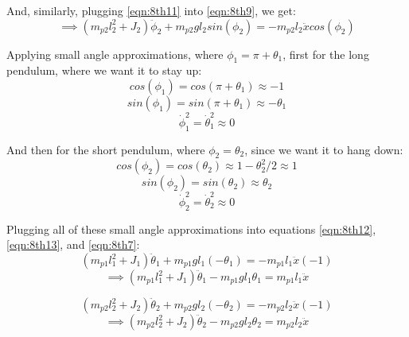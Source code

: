 \documentclass{article}
\begin{document}
And, similarly, plugging \ref{eqn:8th11} into \ref{eqn:8th9}, we get:
\begin{equation}
\implies (m_{p2} l_2^2 + J_2) \ddot{\phi}_2 + m_{p2} g l_2 sin(\phi_2) = -m_{p2} l_2 \ddot{x} cos(\phi_2)
\label{eqn:8th13}
\end{equation}

Applying small angle approximations, where $\phi_1 = \pi + \theta_1$, first for the long pendulum, where we want it to stay up:
\begin{equation*}
cos(\phi_1) = cos(\pi + \theta_1) \approx -1
\end{equation*}
\begin{equation*}
sin(\phi_1) = sin(\pi + \theta_1) \approx - \theta_1
\end{equation*}
\begin{equation*}
\dot{\phi}_1^2 = \dot{\theta}_1^2 \approx 0
\end{equation*}

And then for the short pendulum, where $\phi_2 = \theta_2$, since we want it to hang down:
\begin{equation*}
cos(\phi_2) = cos(\theta_2) \approx 1 - \theta_2^2 / 2 \approx 1
\end{equation*}
\begin{equation*}
sin(\phi_2) = sin(\theta_2) \approx \theta_2
\end{equation*}
\begin{equation*}
\dot{\phi}_2^2 = \dot{\theta}_2^2 \approx 0
\end{equation*}

Plugging all of these small angle approximations into equations \ref{eqn:8th12}, \ref{eqn:8th13}, and \ref{eqn:8th7}:
\begin{equation*}
(m_{p1} l_1^2 + J_1) \ddot{\theta}_1 + m_{p1} g l_1 (-\theta_1) = -m_{p1} l_1 \ddot{x} (-1)
\end{equation*}
\begin{equation}
\implies (m_{p1} l_1^2 + J_1) \ddot{\theta}_1 - m_{p1} g l_1 \theta_1 = m_{p1} l_1 \ddot{x}
\label{eqn:8th14}
\end{equation}

\begin{equation*}
(m_{p2} l_2^2 + J_2) \ddot{\theta}_2 + m_{p2} g l_2 (-\theta_2) = -m_{p2} l_2 \ddot{x} (-1)
\end{equation*}
\begin{equation}
\implies (m_{p2} l_2^2 + J_2) \ddot{\theta}_2 - m_{p2} g l_2 \theta_2 = m_{p2} l_2 \ddot{x}
\label{eqn:8th15}
\end{equation}
\end{document}
